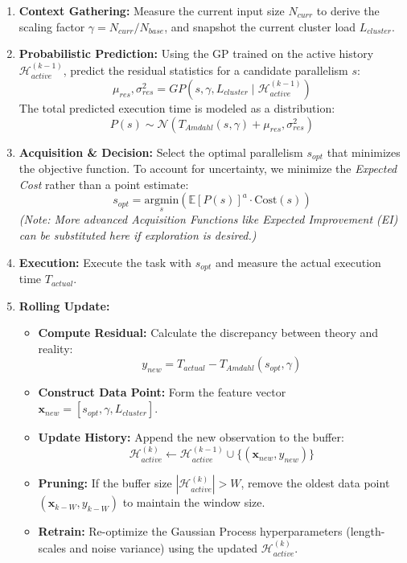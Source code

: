\documentclass[a4paper, 12pt]{article}
\begin{document}
	\begin{enumerate}
		\item \textbf{Context Gathering:} 
		Measure the current input size $N_{curr}$ to derive the scaling factor $\gamma = N_{curr} / N_{base}$, and snapshot the current cluster load $L_{cluster}$.
		
		\item \textbf{Probabilistic Prediction:} 
		Using the GP trained on the active history $\mathcal{H}_{active}^{(k-1)}$, predict the residual statistics for a candidate parallelism $s$:
		\[
		\mu_{res}, \sigma_{res}^2 = GP(s, \gamma, L_{cluster} \mid \mathcal{H}_{active}^{(k-1)})
		\]
		The total predicted execution time is modeled as a distribution:
		\[
		P(s) \sim \mathcal{N}\left(T_{Amdahl}(s, \gamma) + \mu_{res}, \sigma_{res}^2\right)
		\]
		
		\item \textbf{Acquisition \& Decision:}
		Select the optimal parallelism $s_{opt}$ that minimizes the objective function. To account for uncertainty, we minimize the \textit{Expected Cost} rather than a point estimate:
		\[
		s_{opt} = \underset{s}{\mathrm{argmin}} \left( \mathbb{E}[P(s)]^a \cdot \text{Cost}(s) \right)
		\]
		\textit{(Note: More advanced Acquisition Functions like Expected Improvement (EI) can be substituted here if exploration is desired.)}
		
		\item \textbf{Execution:} 
		Execute the task with $s_{opt}$ and measure the actual execution time $T_{actual}$.
		
		\item \textbf{Rolling Update:}
		\begin{itemize}
			\item \textbf{Compute Residual:} Calculate the discrepancy between theory and reality:
			\[ y_{new} = T_{actual} - T_{Amdahl}(s_{opt}, \gamma) \]
			\item \textbf{Construct Data Point:} Form the feature vector $\mathbf{x}_{new} = [s_{opt}, \gamma, L_{cluster}]$.
			\item \textbf{Update History:} Append the new observation to the buffer:
			\[ \mathcal{H}_{active}^{(k)} \leftarrow \mathcal{H}_{active}^{(k-1)} \cup \{ (\mathbf{x}_{new}, y_{new}) \} \]
			\item \textbf{Pruning:} If the buffer size $|\mathcal{H}_{active}^{(k)}| > W$, remove the oldest data point $(\mathbf{x}_{k-W}, y_{k-W})$ to maintain the window size.
			\item \textbf{Retrain:} Re-optimize the Gaussian Process hyperparameters (length-scales and noise variance) using the updated $\mathcal{H}_{active}^{(k)}$.
		\end{itemize}
	\end{enumerate}
	
\end{document}
